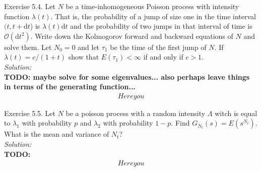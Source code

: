 \documentclass[10pt]{amsart}
\newcommand{\D}{\mathrm{d}}
\begin{document}
\newpage

 Exercise 5.4.
Let $N$ be a time-inhomogeneous Poisson process with intensity function $\lambda(t)$.
That is, the probability of a jump of size one in the time interval $(t, t + \D t$) is $\lambda(t) \D t$ and the probability of two jumps in that interval of time is $\mathcal O(\D t^2)$.
Write down the Kolmogorov forward and backward equations of $N$ and solve them.
Let $N_0 = 0$ and let $\tau_1$ be the time of the first jump of $N$.
If $\lambda(t) = c/(1 + t)$ show that $E(\tau_1) < \infty$ if and only if $c > 1$. \\

\noindent
\textit{Solution:} \\
\textbf{TODO: maybe solve for some eigenvalues... also perhaps leave things in terms of the generating function...} \\
\begin{align*}
Here you
\end{align*}

\newpage

 Exercise 5.5.
Let $N$ be a poisson process with a random intensity $\Lambda$ witch is equal to $\lambda_1$ with probability $p$ and $\lambda_2$ with probability $1 - p$.
Find $G_{N_t}(s) = E(s^{N_t})$.
What is the mean and variance of $N_t$? \\

\noindent
\textit{Solution:} \\
\textbf{TODO:} \\
\begin{align*}
Here you
\end{align*}
\end{document}
